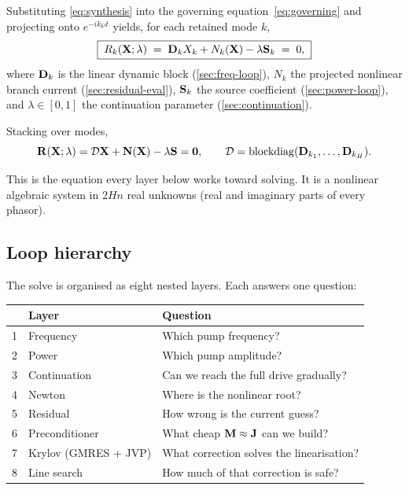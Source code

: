 Substituting \eqref{eq:synthesis} into the governing
equation~\eqref{eq:governing} and projecting onto $e^{-ik\wp t}$ yields, for
each retained mode $k$,
\begin{equation}
  \boxed{\;
  R_k(\mathbf{X};\lambda)
  \;=\;
  \mathbf{D}_k X_k + N_k(\mathbf{X}) - \lambda \mathbf{S}_k
  \;=\; 0,
  \;}
  \label{eq:residual-k}
\end{equation}
where $\mathbf{D}_k$ is the linear dynamic block (\cref{sec:freq-loop}), $N_k$ the
projected nonlinear branch current (\cref{sec:residual-eval}), $\mathbf{S}_k$ the
source coefficient (\cref{sec:power-loop}), and $\lambda\in[0,1]$ the
continuation parameter (\cref{sec:continuation}).

Stacking over modes,
\begin{equation}
  \mathbf{R}(\mathbf{X};\lambda)
  = \mathcal{D}\mathbf{X} + \mathbf{N}(\mathbf{X}) - \lambda\mathbf{S}
  = \mathbf{0},
  \qquad
  \mathcal{D} = \operatorname{blockdiag}(\mathbf{D}_{k_1},\dots,\mathbf{D}_{k_H}).
  \label{eq:residual-stacked}
\end{equation}

This is the equation every layer below works toward solving. It is a nonlinear
algebraic system in $2Hn$ real unknowns (real and imaginary parts of every
phasor).

\subsection{Loop hierarchy}

The solve is organised as eight nested layers. Each answers one question:

\begin{center}
\begin{tabular}{@{}r l l@{}}
\toprule
& \textbf{Layer} & \textbf{Question} \\
\midrule
1 & Frequency      & Which pump frequency? \\
2 & Power          & Which pump amplitude? \\
3 & Continuation   & Can we reach the full drive gradually? \\
4 & Newton         & Where is the nonlinear root? \\
5 & \quad Residual & How wrong is the current guess? \\
6 & \quad Preconditioner & What cheap $\mathbf{M}\approx\mathbf{J}$ can we build? \\
7 & \quad Krylov (GMRES + JVP) & What correction solves the linearisation? \\
8 & \quad Line search & How much of that correction is safe? \\
\bottomrule
\end{tabular}
\end{center}

